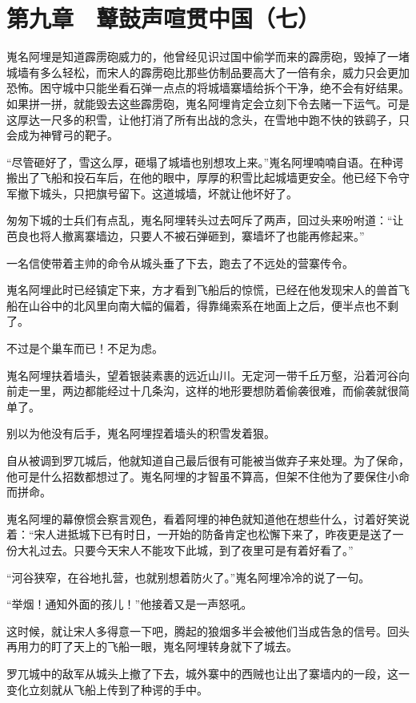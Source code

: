 \section{第九章　鼙鼓声喧贯中国（七）}

嵬名阿埋是知道霹雳砲威力的，他曾经见识过国中偷学而来的霹雳砲，毁掉了一堵城墙有多么轻松，而宋人的霹雳砲比那些仿制品要高大了一倍有余，威力只会更加恐怖。困守城中只能坐看石弹一点点的将城墙寨墙给拆个干净，绝不会有好结果。如果拼一拼，就能毁去这些霹雳砲，嵬名阿埋肯定会立刻下令去赌一下运气。可是这厚达一尺多的积雪，让他打消了所有出战的念头，在雪地中跑不快的铁鹞子，只会成为神臂弓的靶子。

“尽管砸好了，雪这么厚，砸塌了城墙也别想攻上来。”嵬名阿埋喃喃自语。在种谔搬出了飞船和投石车后，在他的眼中，厚厚的积雪比起城墙更安全。他已经下令守军撤下城头，只把旗号留下。这道城墙，坏就让他坏好了。

匆匆下城的士兵们有点乱，嵬名阿埋转头过去呵斥了两声，回过头来吩咐道：“让芭良也将人撤离寨墙边，只要人不被石弹砸到，寨墙坏了也能再修起来。”

一名信使带着主帅的命令从城头垂了下去，跑去了不远处的营寨传令。

嵬名阿埋此时已经镇定下来，方才看到飞船后的惊慌，已经在他发现宋人的兽首飞船在山谷中的北风里向南大幅的偏着，得靠绳索系在地面上之后，便半点也不剩了。

不过是个巢车而已！不足为虑。

嵬名阿埋扶着墙头，望着银装素裹的远近山川。无定河一带千丘万壑，沿着河谷向前走一里，两边都能经过十几条沟，这样的地形要想防着偷袭很难，而偷袭就很简单了。

别以为他没有后手，嵬名阿埋捏着墙头的积雪发着狠。

自从被调到罗兀城后，他就知道自己最后很有可能被当做弃子来处理。为了保命，他可是什么招数都想过了。嵬名阿埋的才智虽不算高，但架不住他为了要保住小命而拼命。

嵬名阿埋的幕僚惯会察言观色，看着阿埋的神色就知道他在想些什么，讨着好笑说着：“宋人进抵城下已有时日，一开始的防备肯定也松懈下来了，昨夜更是送了一份大礼过去。只要今天宋人不能攻下此城，到了夜里可是有着好看了。”

“河谷狭窄，在谷地扎营，也就别想着防火了。”嵬名阿埋冷冷的说了一句。

“举烟！通知外面的孩儿！”他接着又是一声怒吼。

这时候，就让宋人多得意一下吧，腾起的狼烟多半会被他们当成告急的信号。回头再用力的盯了天上的飞船一眼，嵬名阿埋转身就下了城去。

罗兀城中的敌军从城头上撤了下去，城外寨中的西贼也让出了寨墙内的一段，这一变化立刻就从飞船上传到了种谔的手中。

